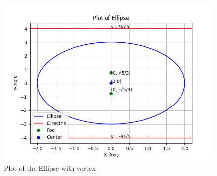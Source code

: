 \documentclass[twocolumn]{article}
\theoremstyle{remark}
\numberwithin{equation}{subsection}
\let\vec\mathbf
\begin{document}
\centering
\begin{figure}[!ht]
\includegraphics[width=1.1\columnwidth]{Figure_1.png}
\caption{Plot of the Ellipse with vertex \vec{c}}
\label{fig}
\end{figure}
\end{document}
